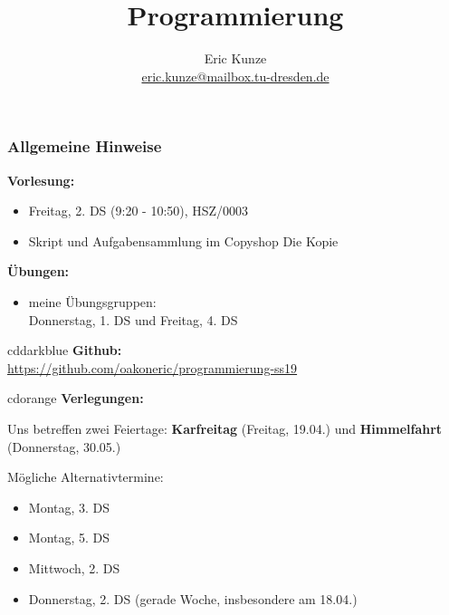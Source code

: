 \documentclass[aspectratio=1610,onlymath, ngerman]{beamer}
\title{Programmierung}%
\subtitle{Übung #1: #2}%
\author{Eric Kunze \\ \url{eric.kunze@mailbox.tu-dresden.de} }%
\date{#3}%
\renewcommand{\emph}[1]{\textbf{#1}}
\begin{document}
    \maketitle
    
    \begin{frame}\frametitle{Allgemeine Hinweise}
        \begin{minipage}{\dimexpr0.5\linewidth-\fboxrule-\fboxsep}
            \emph{Vorlesung:}
            \begin{itemize}
                \item Freitag, 2. DS (9:20 - 10:50), HSZ/0003
                \item Skript und Aufgabensammlung im Copyshop \glqq Die Kopie\grqq
            \end{itemize}
            
            \medskip
            
            \emph{Übungen:}
            \begin{itemize}
                \item meine Übungsgruppen: \\
                Donnerstag, 1. DS und Freitag, 4. DS
            \end{itemize}
           \end{minipage}
           \pause
           \begin{minipage}{\dimexpr0.5\linewidth-\fboxrule-\fboxsep}
            \begin{doodle}{cddarkblue}
                \emph{Github:} \\
                \url{https://github.com/oakoneric/programmierung-ss19}
            \end{doodle}
        \end{minipage}
        \pause
        \begin{doodle}{cdorange}
            {\normalsize \bfseries Verlegungen:} \par 
            \smallskip
            Uns betreffen zwei Feiertage: \quad
            \emph{Karfreitag} (Freitag, 19.04.) und \emph{Himmelfahrt} (Donnerstag, 30.05.) \par \smallskip
            
            Mögliche Alternativtermine:
            \begin{itemize}
                \item Montag, 3. DS
                \item Montag, 5. DS
                \item Mittwoch, 2. DS
                \item Donnerstag, 2. DS (gerade Woche, insbesondere am 18.04.)
            \end{itemize}
        \end{doodle}  
    \end{frame}
\end{document}
